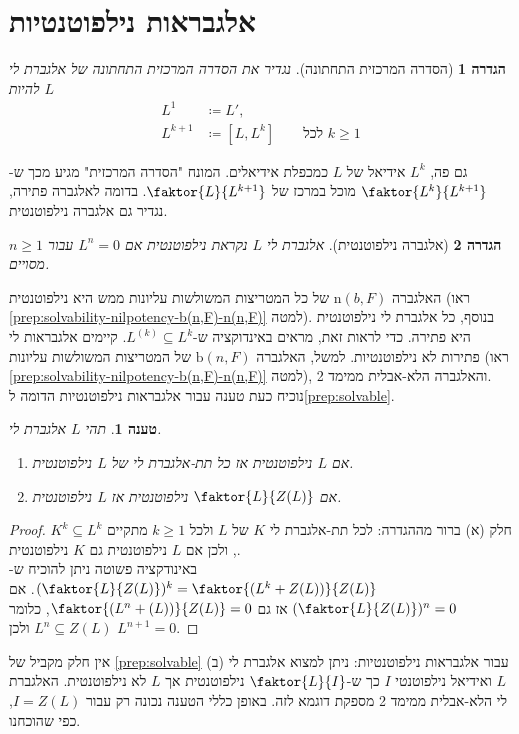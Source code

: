 \documentclass{report}
\theoremstyle{break}
\newtheorem{preposition}[preposition]{טענה}
\newtheorem{definition}[definition]{הגדרה}
\theoremstyle{MyNonumberbreak}
\newtheorem{proof}{הוכחה}
\begin{document}
\section{אלגבראות נילפוטנטיות}
\begin{definition}[הסדרה המרכזית התחתונה] \label{def:lower-central-series}
	נגדיר את \textit{הסדרה המרכזית התחתונה} של אלגברת לי $L$ להיות
	\begin{align*}
		L^1 &\coloneqq L', \\
		L^{k+1} &\coloneqq [L, L^k] \qquad \text{לכל $k \ge 1$}
	\end{align*}
\end{definition}
גם פה, $L^k$ אידיאל של $L$ כמכפלת אידיאלים. המונח "הסדרה המרכזית" מגיע מכך ש-$\faktor{L^k}{L^{k+1}}$ מוכל במרכז של $\faktor{L}{L^{k+1}}$. בדומה לאלגברה פתירה, נגדיר גם אלגברה נילפוטנטית.
\begin{definition}[אלגברה נילפוטנטית] \label{def:nilpotent-algebra}
	אלגברת לי $L$ נקראת \textit{נילפוטנטית} אם $L^n = 0$ עבור $n \ge 1$ מסויים.
\end{definition}
האלגברה $\mathrm{n}(b, F)$ של כל המטריצות המשולשות עליונות ממש היא נילפוטנטית (ראו \autoref*{prep:solvability-nilpotency-b(n,F)-n(n,F)} למטה). בנוסף, כל אלגברת לי נילפוטנטית היא פתירה. כדי לראות זאת, מראים באינדוקציה ש-$L^{(k)} \subseteq L^k$. קיימים אלגבראות לי פתירות לא נילפוטנטיות. למשל, האלגברה $\mathrm{b}(n, F)$ של המטריצות המשולשות עליונות (ראו \autoref*{prep:solvability-nilpotency-b(n,F)-n(n,F)} למטה), והאלגברה הלא-אבלית ממימד 2. \\
נוכיח כעת טענה עבור אלגבראות נילפוטנטיות הדומה ל\autoref*{prep:solvable}.
\begin{preposition} \label{prep:nilpotent}
	תהי $L$ אלגברת לי.
	\begin{enumerate}[label=(\alph*)]
		\item 
		אם $L$ נילפוטנטית אז כל תת-אלגברת לי של $L$ נילפוטנטית.
		\item
		אם $\faktor{L}{Z(L)}$ נילפוטנטית אז $L$ נילפוטנטית.
	\end{enumerate}
\end{preposition}
\begin{proof}
	חלק (א) ברור מההגדרה: לכל תת-אלגברת לי $K$ של $L$ ולכל $k \ge 1$ מתקיים $K^k \subseteq L^k$, ולכן אם $L$ נילפוטנטית גם $K$ נילפוטנטית. \\
	באינודקציה פשוטה ניתן להוכיח ש-$(\faktor{L}{Z(L)})^k = \faktor{(L^k + Z(L))}{Z(L)}$. אם $(\faktor{L}{Z(L)})^n = 0$ אז גם $\faktor{(L^n + (L))}{Z(L)} = 0$, כלומר $L^n \subseteq Z(L)$ ולכן $L^{n+1} = 0$.
\end{proof}
אין חלק מקביל של \autoref*{prep:solvable} (ב) עבור אלגבראות נילפוטנטיות: ניתן למצוא אלגברת לי $L$ ואידיאל נילפוטנטי $I$ כך ש-$\faktor{L}{I}$ נילפוטנטית אך $L$ לא נילפוטנטית. האלגברת לי הלא-אבלית ממימד 2 מספקת דוגמא לזה. באופן כללי הטענה נכונה רק עבור $I = Z(L)$, כפי שהוכחנו.
\end{document}
